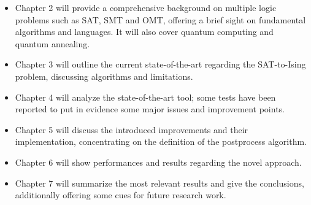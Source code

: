 \begin{itemize}
    \item Chapter 2 will provide a comprehensive background on multiple logic problems such as SAT, SMT and OMT, offering a brief sight on fundamental algorithms and languages. It will also cover quantum computing and quantum annealing.
    \item Chapter 3 will outline the current state-of-the-art regarding the SAT-to-Ising problem, discussing algorithms and limitations.
    \item Chapter 4 will analyze the state-of-the-art tool; some tests have been reported to put in evidence some major issues and improvement points.
    \item Chapter 5 will discuss the introduced improvements and their implementation, concentrating on the definition of the postprocess algorithm.
    \item Chapter 6 will show performances and results regarding the novel approach. 
    \item Chapter 7 will summarize the most relevant results and give the conclusions, additionally offering some cues for future research work.
\end{itemize}

\newpage